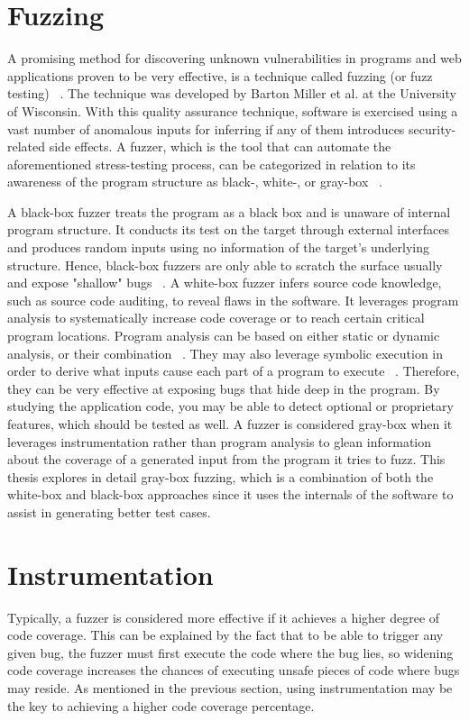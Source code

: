 \section{Fuzzing}
A promising method for discovering unknown vulnerabilities in
programs and web applications proven to be very effective, is a technique called fuzzing (or fuzz testing) ~\cite{fuzzing_def}. The technique was developed by Barton Miller et al. at the University of Wisconsin.
With this quality assurance technique, software is exercised using a vast number of anomalous inputs for inferring if any of them introduces security-related side effects. A fuzzer, which is the tool that can automate the aforementioned stress-testing process, can be categorized in relation to its awareness of the program structure as black-, white-, or gray-box ~\cite{fuzzing_book}. 

A black-box fuzzer treats the program as a black box and is unaware of
internal program structure. It conducts its test on the target through external
interfaces and produces random inputs using no information of the target's underlying structure. Hence,  black-box fuzzers are only able to scratch the surface usually and expose "shallow" bugs ~\cite{fuzzing_owasp}. 
A white-box fuzzer infers source code knowledge, such as source code auditing, to reveal
flaws in the software. It leverages program analysis to systematically
increase code coverage or to reach certain critical program locations. Program analysis can be based on either static or dynamic analysis, or their combination ~\cite{program_analysis_book}. They may also leverage symbolic execution in order to derive what inputs cause each part of a program to execute ~\cite{symbolic_exe}. Therefore, they can be very effective at exposing bugs that hide deep in the program. By studying the application code, you may be able to detect optional or proprietary features, which should be tested as well.
A fuzzer is considered gray-box when it leverages instrumentation rather than program analysis to glean information about the coverage of a generated input from the program it tries to fuzz. This thesis explores in detail gray-box fuzzing, which is a combination of both the white-box and black-box approaches since it uses the internals of the software to assist in generating better test cases.

\section{Instrumentation}
Typically, a fuzzer is considered more effective if it achieves a higher degree of code coverage. This can be explained by the fact that to be able to trigger any given bug, the fuzzer must first execute the code where the bug lies, so widening code coverage increases the chances of executing unsafe pieces of code where bugs may reside. As mentioned in the previous section, using instrumentation may be the key to achieving a higher code coverage percentage. 

